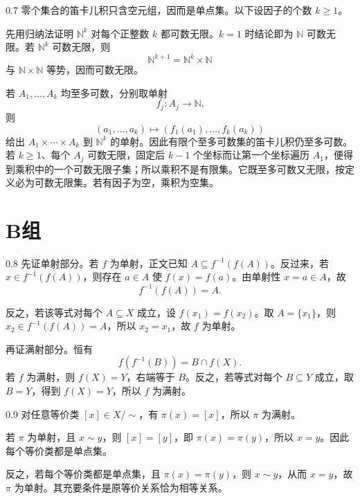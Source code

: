 \begin{solution}{0.7}
零个集合的笛卡儿积只含空元组，因而是单点集。以下设因子的个数 \(k\ge1\)。

先用归纳法证明 \(\mathbb N^k\) 对每个正整数 \(k\) 都可数无限。\(k=1\) 时结论即为 \(\mathbb N\) 可数无限。若 \(\mathbb N^k\) 可数无限，则
\[
  \mathbb N^{k+1}=\mathbb N^k\times\mathbb N
\]
与 \(\mathbb N\times\mathbb N\) 等势，因而可数无限。

若 \(A_1,\ldots,A_k\) 均至多可数，分别取单射
\[
  f_j:A_j\longrightarrow\mathbb N.
\]
则
\[
  (a_1,\ldots,a_k)\longmapsto
  (f_1(a_1),\ldots,f_k(a_k))
\]
给出 \(A_1\times\cdots\times A_k\) 到 \(\mathbb N^k\) 的单射。因此有限个至多可数集的笛卡儿积仍至多可数。若 \(k\ge1\)、每个 \(A_j\) 可数无限，固定后 \(k-1\) 个坐标而让第一个坐标遍历 \(A_1\)，便得到乘积中的一个可数无限子集；所以乘积不是有限集。它既至多可数又无限，按定义必为可数无限集。若有因子为空，乘积为空集。
\end{solution}

\section*{B组}

\begin{solution}{0.8}
先证单射部分。若 \(f\) 为单射，正文已知 \(A\subseteq f^{-1}(f(A))\)。反过来，若 \(x\in f^{-1}(f(A))\)，则存在 \(a\in A\) 使 \(f(x)=f(a)\)。由单射性 \(x=a\in A\)，故
\[
  f^{-1}(f(A))=A.
\]

反之，若该等式对每个 \(A\subseteq X\) 成立，设 \(f(x_1)=f(x_2)\)。取 \(A=\{x_1\}\)，则 \(x_2\in f^{-1}(f(A))=A\)，所以 \(x_2=x_1\)，故 \(f\) 为单射。

再证满射部分。恒有
\[
  f(f^{-1}(B))=B\cap f(X).
\]
若 \(f\) 为满射，则 \(f(X)=Y\)，右端等于 \(B\)。反之，若等式对每个 \(B\subseteq Y\) 成立，取 \(B=Y\)，得到 \(f(X)=Y\)，所以 \(f\) 为满射。
\end{solution}

\begin{solution}{0.9}
对任意等价类 \([x]\in X/{\sim}\)，有 \(\pi(x)=[x]\)，所以 \(\pi\) 为满射。

若 \(\pi\) 为单射，且 \(x\sim y\)，则 \([x]=[y]\)，即 \(\pi(x)=\pi(y)\)，所以 \(x=y\)。因此每个等价类都是单点集。

反之，若每个等价类都是单点集，且 \(\pi(x)=\pi(y)\)，则 \(x\sim y\)，从而 \(x=y\)，故 \(\pi\) 为单射。其充要条件是原等价关系恰为相等关系。
\end{solution}

